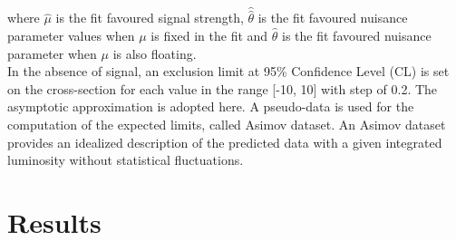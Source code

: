 where $\hat{\mu}$ is the fit favoured signal strength, $\hat{\hat{\theta}}$ is the fit favoured nuisance parameter values when $\mu$ is fixed in the fit and $\hat{\theta}$ is the fit favoured nuisance parameter when $\mu$ is also floating. \\
In the absence of signal, an exclusion limit at 95\% Confidence Level (CL) is set on the \HHyybb cross-section for each \kl value in the range [-10, 10] with step of 0.2. The asymptotic approximation \cite{Z} is adopted here. A pseudo-data is used for the computation of the expected limits, called Asimov dataset. An Asimov dataset provides an idealized description of the predicted data with a given integrated luminosity without statistical fluctuations.

\section{Results}
\label{HHyybb:Results}

